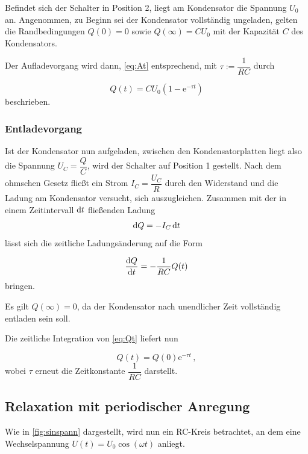Befindet sich der Schalter in Position 2, liegt am Kondensator die Spannung $U_0$ an.
Angenommen, zu Beginn sei der Kondensator vollständig ungeladen, gelten die Randbedingungen $Q(0) = 0$ sowie $Q(\infty) = C U_0$ mit der Kapazität $C$ des Kondensators.

Der Aufladevorgang wird dann, \eqref{eq:At} entsprechend, mit $τ := \dfrac{1}{RC}$ durch

\begin{equation*}
    Q(t) = C U_0 (1 - \text{e}^{-τ t})
    \label{eq:aufladung}
\end{equation*} beschrieben.


\subsubsection{Entladevorgang}

Ist der Kondensator nun aufgeladen, zwischen den Kondensatorplatten liegt also die Spannung $U_C = \dfrac{Q}{C}$, wird der Schalter auf Position 1 gestellt.
Nach dem ohmschen Gesetz fließt ein Strom $I_C = \dfrac{U_C}{R}$ durch den Widerstand und die Ladung am Kondensator versucht, sich auszugleichen.
Zusammen mit der in einem Zeitintervall $\mathrm{d} t$ fließenden Ladung
\begin{equation}
    \mathrm{d} Q = -I_C \,\mathrm{d} t
    \label{eq:difQ}
\end{equation} lässt sich die zeitliche Ladungsänderung auf die Form

\begin{equation}
    \frac{\mathrm{d} Q}{\mathrm{d} t} = -\frac{1}{RC} Q(t)
    \label{eq:Qt}
\end{equation} bringen.

Es gilt $Q(\infty) = 0$, da der Kondensator nach unendlicher Zeit vollständig entladen sein soll.

Die zeitliche Integration von \eqref{eq:Qt} liefert nun

\begin{equation*}
    Q(t) = Q(0) \text{e}^{-τ t}\,,
\end{equation*} wobei $τ$ erneut die Zeitkonstante $\dfrac{1}{RC}$ darstellt.


\subsection{Relaxation mit periodischer Anregung}

Wie in \autoref{fig:sinspann} dargestellt, wird nun ein RC-Kreis betrachtet, an dem eine Wechselspannung $U(t) = U_0 \cos(ω t)$ anliegt.


